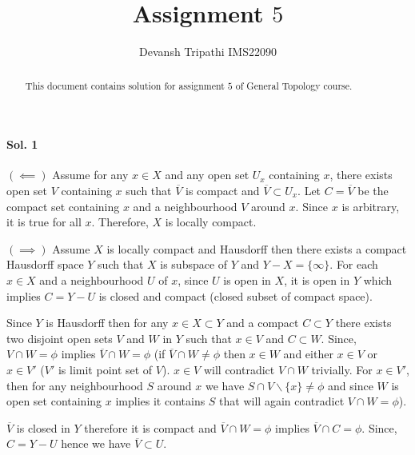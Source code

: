 \documentclass[12pt,reqno]{amsart}
\title{Assignment $5$}
\author{Devansh Tripathi IMS22090}
\theoremstyle{plain}
\theoremstyle{definition}
\begin{document}
\begin{abstract}
    This document contains solution for assignment $5$ of General Topology course.
\end{abstract}
\maketitle
\begin{center}
    \item \paragraph{{\bf Sol. 1}}
\end{center}
$(\impliedby)$ Assume for any $x \in X$ and any open set $U_x$ containing $x$, there exists open set $V$ containing $x$ such that $\overline{V}$ is compact and $\overline{V} \subset U_x$. Let $C = \overline{V}$ be the compact set containing $x$ and a neighbourhood $V$ around $x$. Since $x$ is arbitrary, it is true for all $x$. Therefore, $X$ is locally compact.

\noindent $(\implies)$ Assume $X$ is locally compact and Hausdorff then there exists a compact Hausdorff space $Y$ such that $X$ is subspace of $Y$ and $Y - X = \{\infty\}$. For each $x \in X$ and a neighbourhood $U$ of $x$, since $U$ is open in $X$, it is open in $Y$ which implies $C = Y - U$ is closed and compact (closed subset of compact space).

\noindent Since $Y$ is Hausdorff then for any $x \in X \subset Y$ and a compact $C \subset Y$ there exists two disjoint open sets $V$ and $W$ in $Y$ such that $x \in V$ and $C \subset W$. Since, $V \cap W = \phi$ implies $\overline{V} \cap W = \phi$ (if $\overline{V} \cap W \neq \phi$ then $x \in W$ and either $x \in V$ or $x \in V'$ ($V'$ is limit point set of $V$). $x \in V$ will contradict $V \cap W$ trivially. For $x \in V'$, then for any neighbourhood $S$ around $x$ we have $ S \cap V\backslash\{x\} \neq \phi$ and since $W$ is open set containing $x$ implies it contains $S$ that will again contradict $V \cap W = \phi$).

\noindent $\overline{V}$ is closed in $Y$ therefore it is compact and $\overline{V} \cap W = \phi$ implies $\overline{V} \cap C = \phi$. Since, $C = Y - U$ hence we have $\overline{V} \subset U$.
\end{document}
